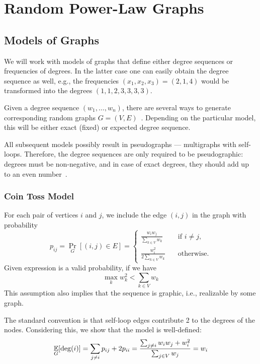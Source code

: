 \chapter{Random Power-Law Graphs}
\label{ch:powerlaw}

\section{Models of Graphs}

We will work with models of graphs that define either degree sequences or frequencies of degrees.
In the latter case one can easily obtain the degree sequence as well,
e.g., the frequencies $(x_1,x_2,x_3)=(2,1,4)$ would be transformed into the degrees $(1,1,2,3,3,3,3)$.

Given a degree sequence $(w_1,\ldots,w_n)$, there are several ways to generate corresponding random graphs $G=(V,E)$~\cite{hop08}.
Depending on the particular model, this will be either exact (fixed) or expected degree sequence.

All subsequent models possibly result in pseudographs --- multigraphs with self-loops.
Therefore, the degree sequences are only required to be pseudographic:
degrees must be non-negative, and in case of exact degrees, they should add up to an even number~\cite{hak62}.

\subsection{Coin Toss Model}

For each pair of vertices $i$ and $j$, we include the edge $(i,j)$ in the graph with probability
\begin{equation}
    p_{ij}=\Pr_G[(i,j)\in E]=
    \begin{cases}
        \frac{w_i w_j}{\sum_{k\in V}{w_k}} & \quad \text{if }i\neq j,\\
        \frac{w_i^2}{2\sum_{k\in V}{w_k}} & \quad \text{otherwise}.
    \end{cases}
\end{equation}
Given expression is a valid probability, if we have
\begin{equation}
    \label{eq:coin-toss-assumption}
    \max_k w_k^2<\sum_{k\in V}{w_k}
\end{equation}
This assumption also implies that the sequence is graphic,
i.e., realizable by some graph.

The standard convention is that self-loop edges contribute 2 to the degrees of the nodes.
Considering this, we show that the model is well-defined:
\begin{equation}
    \mathop{{}\mathbb{E}}_G[\deg(i)]=\sum_{j\neq i}{p_{ij}}+2p_{ii}
    =\frac{\sum_{j\neq i}{w_i w_j}+w_i^2}{\sum_{j\in V}{w_j}}=w_i
\end{equation}

